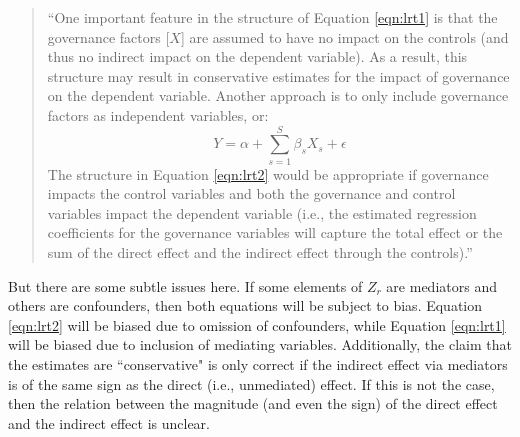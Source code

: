 \documentclass[12pt,reqno,titlepage]{amsart}
\begin{document}
\begin{doublespace}
\begin{quote}\begin{singlespace} 
``One important feature in the structure of Equation \ref{eqn:lrt1} is that the governance factors [$X$] are assumed to have no impact on the controls (and thus no indirect impact on the dependent variable). 
As a result, this structure may result in conservative estimates for the impact of governance on the dependent variable. Another approach is to only include governance factors as independent variables, or:
\begin{equation}
Y = \alpha + \sum_{s =1}^S \beta_s X_s + \epsilon \label{eqn:lrt2}
\end{equation}
The structure in Equation \ref{eqn:lrt2} would be appropriate if governance impacts the control variables and both the governance and control variables impact the dependent variable (i.e., the estimated regression coefficients for the governance variables will capture the total effect or the sum of the direct effect and the indirect effect through the controls).''
\end{singlespace} \end{quote}

But there are some subtle issues here.
If some elements of $Z_r$ are mediators and others are confounders, then both equations will be subject to bias. 
Equation \ref{eqn:lrt2} will be biased due to omission of confounders, while Equation \ref{eqn:lrt1}  will be biased due to inclusion of mediating variables.
Additionally, the claim that the estimates are ``conservative" is only correct if the indirect effect via mediators is of the same sign as the direct (i.e., unmediated) effect. 
If this is not the case, then the relation between the magnitude (and even the sign) of the direct effect and the indirect effect is unclear.


\end{doublespace}
\end{document}

